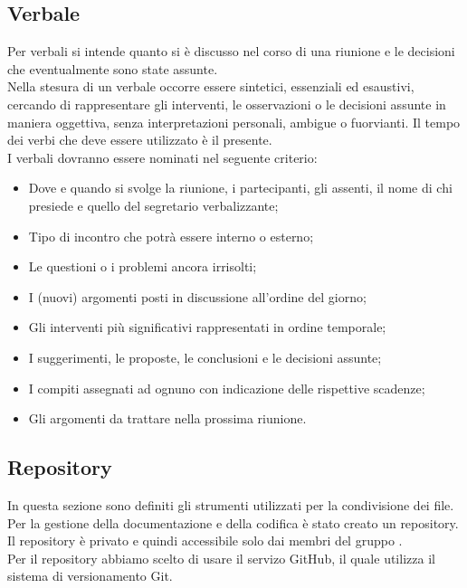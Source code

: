 	\subsection{Verbale}
Per verbali si intende quanto si è discusso nel corso di una riunione e le decisioni che eventualmente sono state assunte. \\
Nella stesura di un verbale occorre essere sintetici, essenziali ed esaustivi, cercando di rappresentare gli interventi, le osservazioni o le decisioni assunte in maniera oggettiva, senza interpretazioni personali, ambigue o fuorvianti. Il tempo dei verbi che deve essere utilizzato è il presente.\\
I verbali dovranno essere nominati nel seguente criterio: 
\begin{itemize}
	\item Dove e quando si svolge la riunione, i partecipanti, gli assenti, il nome di chi presiede e quello del segretario verbalizzante;
	\item Tipo di incontro che potrà essere interno o esterno;
	\item Le questioni o i problemi ancora irrisolti;
	\item I (nuovi) argomenti posti in discussione all'ordine del giorno;
	\item Gli interventi più significativi rappresentati in ordine temporale; 
	\item I suggerimenti, le proposte, le conclusioni e le decisioni assunte; 
	\item I compiti assegnati ad ognuno con indicazione delle rispettive scadenze; 
	\item Gli argomenti da trattare nella prossima riunione. 
\end{itemize}

	\subsection{Repository} \label{repository}
In questa sezione sono definiti gli strumenti utilizzati per la condivisione dei file. \\
Per la gestione della documentazione e della codifica è stato creato un repository. Il repository è privato e quindi accessibile solo dai membri del gruppo \GRUPPO.\\
Per il repository abbiamo scelto di usare il servizo GitHub, il quale utilizza il sistema di versionamento Git.
